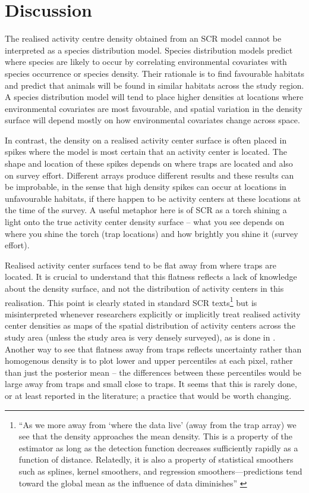 \documentclass[a4paper,12pt]{article}
\begin{document}
\section{Discussion} \label{discussion}
The realised activity centre density obtained from an SCR model cannot be interpreted as a species distribution model. Species distribution models predict where species are likely to occur by correlating environmental covariates with species occurrence or species density. Their rationale is to find favourable habitats and predict that animals will be found in similar habitats across the study region. A species distribution model will tend to place higher densities at locations where environmental covariates are most favourable, and spatial variation in the density surface will depend mostly on how environmental covariates change across space.

In contrast, the density on a realised activity center surface is often placed in spikes where the model is most certain that an activity center is located. The shape and location of these spikes depends on where traps are located and also on survey effort. Different arrays produce different results and these results can be improbable, in the sense that high density spikes can occur at locations in unfavourable habitats, if there happen to be activity centers at these locations at the time of the survey. A useful metaphor here is of SCR as a torch shining a light onto the true activity center density surface -- what you see depends on where you shine the torch (trap locations) and how brightly you shine it (survey effort). 

Realised activity center surfaces tend to be flat away from where traps are located. It is crucial to understand that this flatness reflects a lack of knowledge about the density surface, and not the distribution of activity centers in this realisation. This point is clearly stated in standard SCR texts\footnote{``As we more away from `where the data live' (away from the trap array) we see that the density approaches the mean density. This is a property of the estimator as long as the detection function decreases sufficiently rapidly as a function of distance. Relatedly, it is also a property of statistical smoothers such as splines, kernel smoothers, and regression smoothers---predictions tend toward the global mean as the influence of data diminishes'' \citep[p165-166][]{Royle}} but is misinterpreted whenever researchers explicitly or implicitly treat realised activity center densities as maps of the spatial distribution of activity centers across the study area (unless the study area is very densely surveyed), as is done in \cite{Alexander,???}. Another way to see that flatness away from traps reflects uncertainty rather than homogenous density is to plot lower and upper percentiles at each pixel, rather than just the posterior mean -- the differences between these percentiles would be large away from traps and small close to traps. It seems that this is rarely done, or at least reported in the literature; a practice that would be worth changing. 
\end{document}
